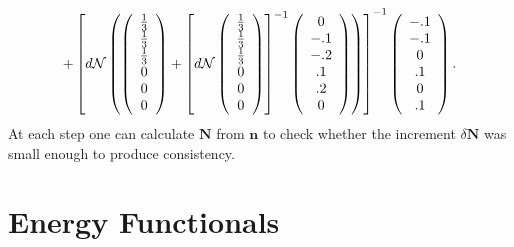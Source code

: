 \documentclass[aps,preprint]{revtex4}%
\begin{document}
\begin{equation}
+\left[  d\mathcal{N}\left(  \left(
\begin{array}
[c]{c}%
\frac{1}{3}\\
\frac{1}{3}\\
\frac{1}{3}\\
0\\
0\\
0
\end{array}
\right)  +\left[  d\mathcal{N}\left(
\begin{array}
[c]{c}%
\frac{1}{3}\\
\frac{1}{3}\\
\frac{1}{3}\\
0\\
0\\
0
\end{array}
\right)  \right]  ^{-1}\left(
\begin{array}
[c]{c}%
0\\
-.1\\
-.2\\
.1\\
.2\\
0
\end{array}
\right)  \right)  \right]  ^{-1}\left(
\begin{array}
[c]{c}%
-.1\\
-.1\\
0\\
.1\\
0\\
.1
\end{array}
\right)  .
\end{equation}
At each step one can calculate $\mathbf{N}$ from $\mathbf{n}$ to check whether
the increment $\delta\mathbf{N}$ was small enough to produce consistency.

\section{Energy Functionals\label{En_Funcs}}
\end{document}
